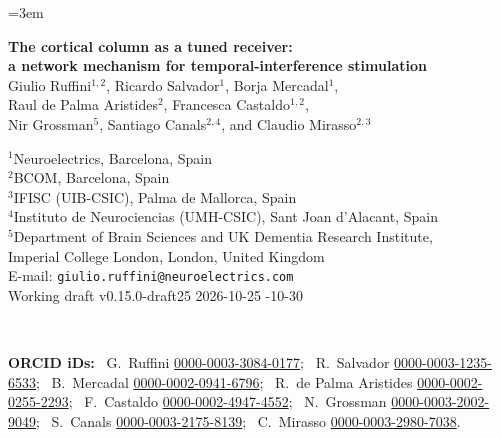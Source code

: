 \documentclass[11pt,a4paper]{article}
\newif\ifjne
\newcommand{\paperver}{0.15.0-draft25} %
\providecommand{\DIFaddtex}[1]{{\protect\color{blue} \sf #1}} %
\providecommand{\DIFdeltex}[1]{{\protect\color{red} \scriptsize #1}} %
\providecommand{\DIFaddbegin}{} %
\providecommand{\DIFaddend}{} %
\providecommand{\DIFdelbegin}{} %
\providecommand{\DIFdelend}{} %
\providecommand{\DIFadd}[1]{\texorpdfstring{\DIFaddtex{#1}}{#1}} %
\providecommand{\DIFdel}[1]{\texorpdfstring{\DIFdeltex{#1}}{}} %
\begin{document}
\emergencystretch=3em
\par

\ifjne
\begin{center}
{\LARGE\bfseries The cortical column as a tuned receiver:\\[4pt]
a network mechanism for temporal-interference stimulation}\\[16pt]
{\large Giulio Ruffini$^{1,2}$, Ricardo Salvador$^{1}$, Borja Mercadal$^{1}$,\\[2pt]
Raul de Palma Aristides$^{2}$, Francesca Castaldo$^{1,2}$,\\[2pt]
Nir Grossman$^{5}$, Santiago Canals$^{2,4}$, and Claudio Mirasso$^{2,3}$}\\[12pt]
\begin{minipage}{0.86\textwidth}\centering\small
$^{1}$Neuroelectrics, Barcelona, Spain\\
$^{2}$BCOM, Barcelona, Spain\\
$^{3}$IFISC (UIB-CSIC), Palma de Mallorca, Spain\\
$^{4}$Instituto de Neurociencias (UMH-CSIC), Sant Joan d'Alacant, Spain\\
$^{5}$Department of Brain Sciences and UK Dementia Research Institute,\\
Imperial College London, London, United Kingdom\\[6pt]
E-mail: \texttt{giulio.ruffini@neuroelectrics.com}\\[4pt]
Working draft v\paperver\quad \DIFdelbegin \DIFdel{2026-10-25
}\DIFdelend \DIFaddbegin \DIFadd{2026-10-30
}\DIFaddend \end{minipage}\\[8pt]
\begin{minipage}{0.86\textwidth}\centering\footnotesize\color{negray}
\textbf{ORCID iDs:}\ %
G.~Ruffini \href{https://orcid.org/0000-0003-3084-0177}{0000-0003-3084-0177};\ %
R.~Salvador \href{https://orcid.org/0000-0003-1235-6533}{0000-0003-1235-6533};\ %
B.~Mercadal \href{https://orcid.org/0000-0002-0941-6796}{0000-0002-0941-6796};\ %
R.~de Palma Aristides \href{https://orcid.org/0000-0002-0255-2293}{0000-0002-0255-2293};\ %
F.~Castaldo \href{https://orcid.org/0000-0002-4947-4552}{0000-0002-4947-4552};\ %
N.~Grossman \href{https://orcid.org/0000-0003-2002-9049}{0000-0003-2002-9049};\ %
S.~Canals \href{https://orcid.org/0000-0003-2175-8139}{0000-0003-2175-8139};\ %
C.~Mirasso \href{https://orcid.org/0000-0003-2980-7038}{0000-0003-2980-7038}.
\end{minipage}
\end{center}
\end{document}
